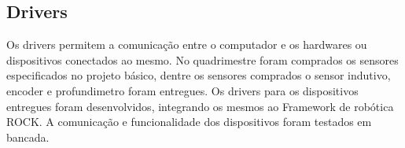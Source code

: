 \noindent
\subsection{Drivers}
Os drivers permitem a comunicação entre o computador e os hardwares ou dispositivos conectados ao mesmo. 
No quadrimestre foram comprados os sensores especificados no projeto básico, dentre os sensores comprados o sensor indutivo, encoder e profundimetro foram entregues. 
Os drivers para os dispositivos entregues foram desenvolvidos, integrando os mesmos ao Framework de robótica ROCK. 
A comunicação e funcionalidade dos dispositivos foram testados em bancada.




  